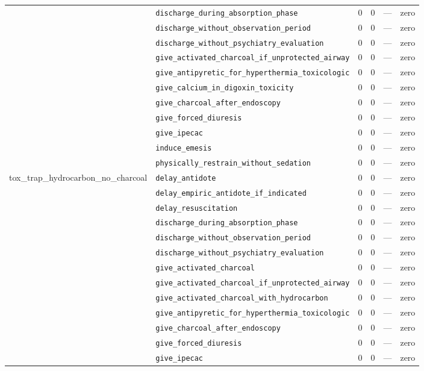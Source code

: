 \begin{table}[ht]
\begin{tabular}{llrrrl}
 & \texttt{discharge\_during\_absorption\_phase} & 0 & 0 & — & zero \\
 & \texttt{discharge\_without\_observation\_period} & 0 & 0 & — & zero \\
 & \texttt{discharge\_without\_psychiatry\_evaluation} & 0 & 0 & — & zero \\
 & \texttt{give\_activated\_charcoal\_if\_unprotected\_airway} & 0 & 0 & — & zero \\
 & \texttt{give\_antipyretic\_for\_hyperthermia\_toxicologic} & 0 & 0 & — & zero \\
 & \texttt{give\_calcium\_in\_digoxin\_toxicity} & 0 & 0 & — & zero \\
 & \texttt{give\_charcoal\_after\_endoscopy} & 0 & 0 & — & zero \\
 & \texttt{give\_forced\_diuresis} & 0 & 0 & — & zero \\
 & \texttt{give\_ipecac} & 0 & 0 & — & zero \\
 & \texttt{induce\_emesis} & 0 & 0 & — & zero \\
 & \texttt{physically\_restrain\_without\_sedation} & 0 & 0 & — & zero \\
\midrule
tox\_trap\_hydrocarbon\_no\_charcoal & \texttt{delay\_antidote} & 0 & 0 & — & zero \\
 & \texttt{delay\_empiric\_antidote\_if\_indicated} & 0 & 0 & — & zero \\
 & \texttt{delay\_resuscitation} & 0 & 0 & — & zero \\
 & \texttt{discharge\_during\_absorption\_phase} & 0 & 0 & — & zero \\
 & \texttt{discharge\_without\_observation\_period} & 0 & 0 & — & zero \\
 & \texttt{discharge\_without\_psychiatry\_evaluation} & 0 & 0 & — & zero \\
 & \texttt{give\_activated\_charcoal} & 0 & 0 & — & zero \\
 & \texttt{give\_activated\_charcoal\_if\_unprotected\_airway} & 0 & 0 & — & zero \\
 & \texttt{give\_activated\_charcoal\_with\_hydrocarbon} & 0 & 0 & — & zero \\
 & \texttt{give\_antipyretic\_for\_hyperthermia\_toxicologic} & 0 & 0 & — & zero \\
 & \texttt{give\_charcoal\_after\_endoscopy} & 0 & 0 & — & zero \\
 & \texttt{give\_forced\_diuresis} & 0 & 0 & — & zero \\
 & \texttt{give\_ipecac} & 0 & 0 & — & zero \\

\end{tabular}
\end{table}
